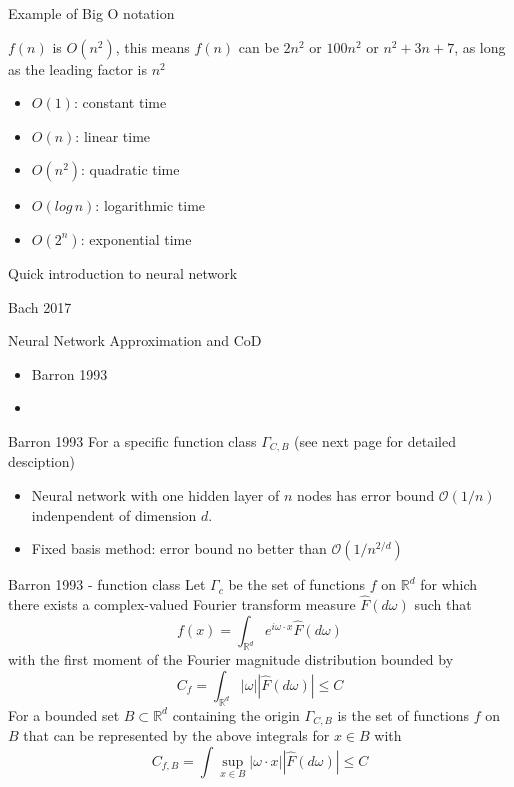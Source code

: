 \documentclass[aspectratio=169]{beamer} %
\begin{document}
\begin{frame}{Example of Big O notation}

$f(n)$ is $O(n^2)$, this means $f(n)$ can be $2n^2$ or $100 n^2$ or $n^2+3n+7$, as long as the leading factor is $n^2$
\begin{itemize}
    \item $O(1)$: constant time
    \item $O(n)$: linear time
    \item $O(n^2)$: quadratic time
    \item $O(log\,n )$:  logarithmic time
    \item $O(2^n)$: exponential time
\end{itemize}
\end{frame}
\begin{frame}{Quick introduction to neural network}
    
\end{frame}
\begin{frame}{Bach 2017}
    
\end{frame}
\begin{frame}{Neural Network Approximation and CoD}
\begin{itemize}
    \item Barron 1993
    \item 
\end{itemize}
    
\end{frame}
\begin{frame}{Barron 1993}
For a specific function class $\Gamma_{C,B}$ (see next page for detailed desciption)
\begin{itemize}
    \item Neural network with one hidden layer of $n$ nodes has error bound $\mathcal{O}(1/n)$ indenpendent of dimension $d$. 
    \item Fixed basis method: error bound no better than $\mathcal{O}(1/n^{2/d})$
\end{itemize}
    
\end{frame}

\begin{frame}{Barron 1993 - function class}
Let $\Gamma_c$ be the set of functions $f$ on $\mathbb{R}^d$ for which there exists a complex-valued Fourier transform measure $\hat F(d\omega)$ such that
$$
f(x) = \int_{\mathbb{R}^d} e^{i\omega\cdot x} \hat F(d\omega)
$$
with the first moment of the Fourier magnitude distribution bounded by
$$
C_f = \int_{\mathbb{R}^d} |\omega||\hat F(d\omega)| \le C
$$
For a bounded set $B\subset\mathbb{R}^d$ containing the origin $\Gamma_{C,B}$ is the set of functions $f$ on $B$ that can be represented by the above integrals for $x\in B$ with
$$
C_{f,B} = \int \sup_{x\in B} |\omega \cdot x| |\hat F(d\omega)|\le C
$$
    
\end{frame}
\end{document}
